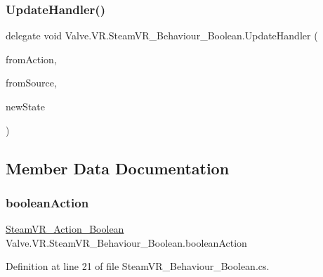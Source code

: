\mbox{\label{class_valve_1_1_v_r_1_1_steam_v_r___behaviour___boolean_ae98c73afb05e760178c435aa4baa175c}} 
\subsubsection{\texorpdfstring{UpdateHandler()}{UpdateHandler()}}
{\footnotesize\ttfamily delegate void Valve.\+V\+R.\+Steam\+V\+R\+\_\+\+Behaviour\+\_\+\+Boolean.\+Update\+Handler (\begin{DoxyParamCaption}\item[{\mbox{\hyperlink{class_valve_1_1_v_r_1_1_steam_v_r___behaviour___boolean}{Steam\+V\+R\+\_\+\+Behaviour\+\_\+\+Boolean}}}]{from\+Action,  }\item[{\mbox{\hyperlink{namespace_valve_1_1_v_r_a82e5bf501cc3aa155444ee3f0662853f}{Steam\+V\+R\+\_\+\+Input\+\_\+\+Sources}}}]{from\+Source,  }\item[{bool}]{new\+State }\end{DoxyParamCaption})}



\subsection{Member Data Documentation}
\mbox{\label{class_valve_1_1_v_r_1_1_steam_v_r___behaviour___boolean_a522b3b344157b96353bb519bced45474}} 
\subsubsection{\texorpdfstring{booleanAction}{booleanAction}}
{\footnotesize\ttfamily \mbox{\hyperlink{class_valve_1_1_v_r_1_1_steam_v_r___action___boolean}{Steam\+V\+R\+\_\+\+Action\+\_\+\+Boolean}} Valve.\+V\+R.\+Steam\+V\+R\+\_\+\+Behaviour\+\_\+\+Boolean.\+boolean\+Action}



Definition at line 21 of file Steam\+V\+R\+\_\+\+Behaviour\+\_\+\+Boolean.\+cs.

